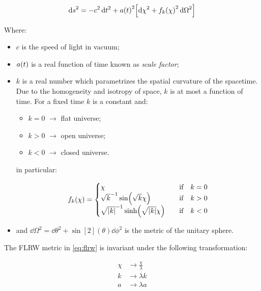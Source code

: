 \begin{equation}
        \dd{s}^2 = -c^2\dd{t^2} + a\qty(t)^2\qty[\dd{\chi}^2 +
        f_k\qty(\chi)^2\dd{\Omega}^2]
        \label{eq:flrw}
\end{equation}

Where:

\begin{itemize}
        \item $c$ is the speed of light in vacuum;
        \item $a\qty(t)$ is a real function of time known as \emph{scale factor};
        \item $k$ is a real number which parametrizes the spatial curvature of the
        spacetime. Due to the homogeneity and isotropy of space, $k$ is at most a
        function of time. For a fixed time $k$ is a constant and:

        \begin{itemize}
                \item $k = 0$ $\rightarrow$ flat universe;
                \item $k > 0$ $\rightarrow$ open universe;
                \item $k < 0$ $\rightarrow$ closed universe.
        \end{itemize}

        in particular:

        \begin{equation}
                f_k\qty(\chi) =
                        \begin{cases}
                                 \chi & \qif k = 0 \\
                                 \sqrt{k}^{-1} \sin(\sqrt{k} \chi) & \qif k > 0 \\
                                 \sqrt{\abs{k}}^{-1} \sinh(\sqrt{\abs{k}} \chi) & \qif k < 0
                        \end{cases}
        \end{equation}
        \item and $\dd{\Omega}^2 = \dd{\theta}^2 + \sin[2](\theta) \dd{\phi}^2$
        is the metric of the unitary sphere.
\end{itemize}

The FLRW metric in \autoref{eq:flrw} is invariant under the following transformation:

\begin{equation}
        \begin{split}
                \chi & \rightarrow \frac{\chi}{\lambda} \\
                k & \rightarrow \lambda k \\
                a & \rightarrow \lambda a
        \end{split}
\end{equation}

